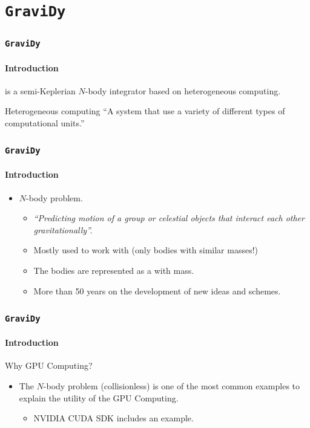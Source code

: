 \section{\texttt{GraviDy}}


\begin{frame}
    \frametitle{\texttt{GraviDy}}
    \framesubtitle{Introduction}
    \begin{center}
         is a semi-Keplerian $N$-body integrator based on heterogeneous computing.
    \end{center}
    \vspace{1cm}
    \small
    {
    \begin{block}{Heterogeneous computing}
            ``A system that use a variety of different types of computational units.''
    \end{block}
    }
\end{frame}

\begin{frame}
    \frametitle{\texttt{GraviDy}}
    \framesubtitle{Introduction}
    \begin{itemize}
        \item $N$-body problem.
        \begin{itemize}
            \item \emph{``Predicting motion of a group or celestial objects that interact each other gravitationally''.}
            \item Mostly used to work with  (only bodies with similar masses!)
            \item The bodies are represented as a  with mass.
            \item More than 50 years on the development of new ideas and schemes.
        \end{itemize}
    \end{itemize}
\end{frame}


\begin{frame}
    \frametitle{\texttt{GraviDy}}
    \framesubtitle{Introduction}

    Why GPU Computing?

    \begin{itemize}
        \item<2-> The $N$-body problem (collisionless) is one of the most common examples
                  to explain the utility of the GPU Computing.
        \begin{itemize}
            \item<3-> NVIDIA CUDA SDK includes an example.
        \end{itemize}
    \end{itemize}
\end{frame}


